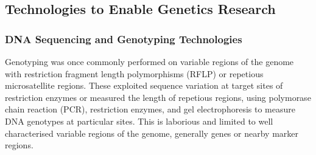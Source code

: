 

\subsection{Technologies to Enable Genetics Research}
\subsubsection{DNA Sequencing and Genotyping Technologies}
Genotyping was once commonly performed on variable regions of the genome with restriction fragment length polymorphisms (RFLP) or repetious microsatellite regions. These exploited sequence variation at target sites of restriction enzymes or measured the length of repetious regions, using polymorase chain reaction (PCR), restriction enzymes, and gel electrophoresis to measure DNA genotypes at particular sites. This is laborious and limited to well characterised variable regions of the genome, generally genes or nearby marker regions. 

